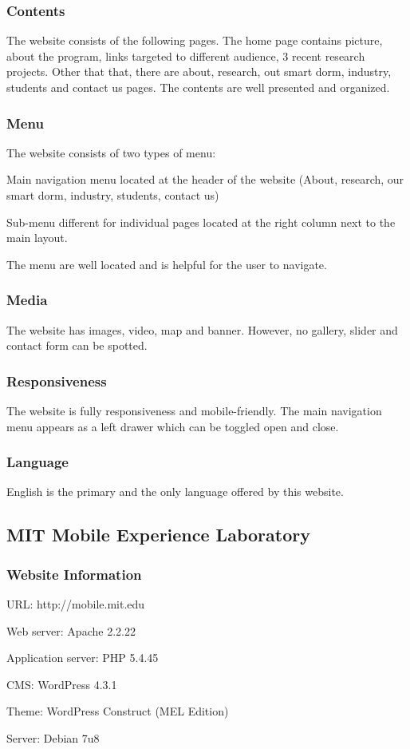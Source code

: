 \subsubsection*{Contents}
The website consists of the following pages. The home page contains picture, about the program, links targeted to different audience, 3 recent research projects. Other that that, there are about, research, out smart dorm, industry, students and contact us pages. The contents are well presented and organized.

\subsubsection*{Menu}
The website consists of two types of menu:
\begin{itemize*}
\item Main navigation menu located at the header of the website (About, research, our smart dorm, industry, students, contact us)
\item Sub-menu different for individual pages located at the right column next to the main layout.
\end{itemize*}

The menu are well located and is helpful for the user to navigate.

\subsubsection*{Media}
The website has images, video, map and banner. However, no gallery, slider and contact form can be spotted.

\subsubsection*{Responsiveness}
The website is fully responsiveness and mobile-friendly. The main navigation menu appears as a left drawer which can be toggled open and close.

\subsubsection*{Language}
English is the primary and the only language offered by this website.

\subsection{MIT Mobile Experience Laboratory}
\subsubsection*{Website Information}
\begin{itemize*}
\item URL: http://mobile.mit.edu
\item Web server: Apache 2.2.22
\item Application server: PHP 5.4.45
\item CMS: WordPress 4.3.1
\item Theme: WordPress Construct (MEL Edition)
\item Server: Debian 7u8
\end{itemize*}

